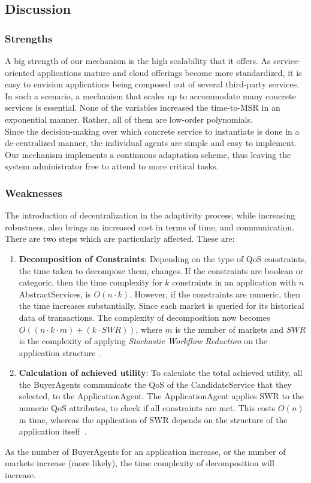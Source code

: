 \documentclass[10pt,journal,compsoc]{IEEEtran}
\begin{document}
\subsection{Discussion}
\subsubsection{Strengths}
A big strength of our mechanism is the high scalability that it offers. As service-oriented applications mature and cloud offerings become more standardized, it is easy to envision applications being composed out of several third-party services. In such a scenario, a mechanism that scales up to accommodate many concrete services is essential. None of the variables increased the time-to-MSR in an exponential manner. Rather, all of them are low-order polynomials.\\
Since the decision-making over which concrete service to instantiate is done in a de-centralized manner, the individual agents are simple and easy to implement. \\    
Our mechanism implements a continuous adaptation scheme, thus leaving the system administrator free to attend to more critical tasks.

\subsubsection{Weaknesses}
The introduction of decentralization in the adaptivity process, while increasing robustness, also brings an increased cost in terms of time, and communication. There are two steps which are particularly affected. These are: 
\begin{enumerate}
    \item \textbf{Decomposition of Constraints}: Depending on the type of QoS constraints, the time taken to decompose them, changes. If the constraints are boolean or categoric, then the time complexity for $k$ constraints in an application with $n$ AbstractServices, is $O(n \cdotp k)$. However, if the constraints are numeric, then the time increases substantially. Since each market is queried for its historical data of transactions. The complexity of decomposition now becomes $O((n \cdotp k \cdotp m) + (k \cdotp SWR))$, where $m$ is the number of markets and $SWR$ is the complexity of applying \textit{Stochastic Workflow Reduction} on the application structure~\cite{Cardoso2004Quality}.
    \item \textbf{Calculation of achieved utility}: To calculate the total achieved utility, all the BuyerAgents communicate the QoS of the CandidateService that they selected, to the ApplicationAgent. The ApplicationAgent applies SWR to the numeric QoS attributes, to check if all constraints are met. This costs $O(n)$ in time, whereas the application of SWR depends on the structure of the application itself~\cite{Cardoso2004Quality}.
\end{enumerate}
As the number of BuyerAgents for an application increase, or the number of markets increase (more likely), the time complexity of decomposition will increase.
\end{document}
